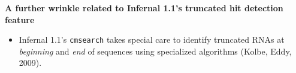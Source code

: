 \documentclass[landscape]{slides}
\begin{document}
\begin{slide}
\begin{center}
\small
\textbf{A further wrinkle related to Infernal 1.1's truncated hit
  detection feature}
\end{center}

\small
\begin{itemize}
\item Infernal 1.1's \texttt{cmsearch} takes special care to identify
  truncated RNAs at \emph{beginning} and \emph{end} of sequences using specialized
  algorithms (Kolbe, Eddy, 2009).
\end{itemize}

\vfill
\end{slide}
\end{document}
